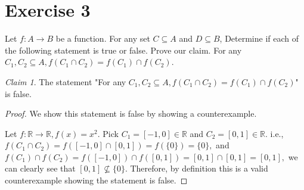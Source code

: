 \documentclass{homework}
\theoremstyle{remark}
\newtheorem*{claim}{Claim}
\newcommand{\?}{\stackrel{?}{=}}
\begin{document}
\newpage
\section*{Exercise 3}
Let $f:A\rightarrow B$ be a function. For any set $C\subseteq A$ and $D\subseteq B$, Determine if each of the following statement is true or false. Prove our claim. 
\question For any $C_1,C_2\subseteq A, f(C_1\cap C_2)=f(C_1)\cap f(C_2)$.
\begin{claim}
    The statement "For any $C_1,C_2\subseteq A, f(C_1\cap C_2)=f(C_1)\cap f(C_2)$" is false. 
\end{claim}
\begin{proof}
    We show this statement is false by showing a counterexample. 

    Let $f: \mathbb{R}\rightarrow \mathbb{R}, f(x)=x^2$. Pick $C_1=[-1,0]\in\mathbb{R}$ and $C_2=[0,1]\in\mathbb{R}$. i.e., $f(C_1\cap C_2)=f([-1,0]\cap[0,1])=f(\{0\})=\{0\},$ and $f(C_1)\cap f(C_2)=f([-1,0])\cap f([0,1])=[0,1]\cap[0,1]=[0,1],$ we can clearly see that $[0,1]\not\subseteq\{0\}$. Therefore, by definition this is a valid counterexample showing the statement is false. 
\end{proof}



    
\end{document}
